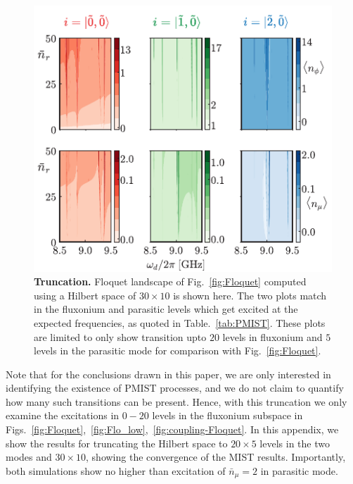 \documentclass[%
reprint,
superscriptaddress,
 amsmath,amssymb,
 aps,
 prx,
longbibliography,
floatfix,
]{revtex4-2}
\begin{document}
\begin{figure}[t]
        \centering
        \includegraphics[width=\linewidth]{Fluxonium_Readout_manuscript/Supp_Fig/Tuncation.pdf}
        \caption{{\bf Truncation.} Floquet landscape of Fig.~\ref{fig:Floquet} computed using a Hilbert space of $30\times 10$ is shown here. The two plots match in the fluxonium and parasitic levels which get excited at the expected frequencies, as quoted in Table.~\ref{tab:PMIST}. These plots are limited to only show transition upto $20$ levels in fluxonium and $5$ levels in the parasitic mode for comparison with Fig.~\ref{fig:Floquet}.
        }
        \label{fig:truncation}
    \end{figure}
    Note that for the conclusions drawn in this paper, we are only interested in identifying the existence of PMIST processes, and we do not claim to quantify how many such transitions can be present. Hence, with this truncation we only examine the excitations in $0-20$ levels in the fluxonium subspace in Figs.~\ref{fig:Floquet},~\ref{fig:Flo_low},~\ref{fig:coupling-Floquet}. In this appendix, we show the results for truncating the Hilbert space to $20
    \times 5$ levels in the two modes and $30
    \times 10$, showing the convergence of the MIST results. Importantly, both simulations show no higher than excitation of $\bar n_\mu=2$ in parasitic mode.
\end{document}
